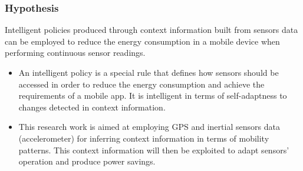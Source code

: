 \documentclass[compress,9pt,xcolor={dvipsnames,table}]{beamer}
\begin{document}
\begin{frame}\frametitle{Hypothesis}
\begin{tcolorbox}[title=Hypothesis,colframe=PineGreen]
Intelligent policies produced through context information built from sensors data can be employed to reduce the energy consumption in a mobile device when performing continuous sensor readings.
\end{tcolorbox}

{
\small
\begin{itemize}
  \item An intelligent policy is a special rule that defines how sensors should be accessed in order to reduce the energy consumption and achieve the requirements of a mobile app.
  It is intelligent in terms of self-adaptness to changes detected in context information.
  \item This research work is aimed at employing GPS and inertial sensors data (accelerometer) for inferring context information in terms of mobility patterns.
  This context information will then be exploited to adapt sensors' operation and produce power savings.
\end{itemize}
}
\end{frame}
\end{document}
